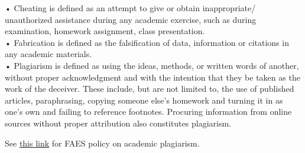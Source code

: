 \documentclass[
]{article}
\begin{document}
• Cheating is defined as an attempt to give or obtain inappropriate/
unauthorized assistance during any academic exercise, such as during
examination, homework assignment, class presentation.\\
• Fabrication is defined as the falsification of data, information or
citations in any academic materials.\\
• Plagiarism is defined as using the ideas, methods, or written words of
another, without proper acknowledgment and with the intention that they
be taken as the work of the deceiver. These include, but are not limited
to, the use of published articles, paraphrasing, copying someone else's
homework and turning it in as one's own and failing to reference
footnotes. Procuring information from online sources without proper
attribution also constitutes plagiarism.

See
\href{https://faes.org/sites/default/files/Student_Handbook_2016-17.pdfhttps://faes.org/sites/default/files/Student_Handbook_2016-17.pdf}{this
link} for FAES policy on academic plagiarism.
\end{document}
